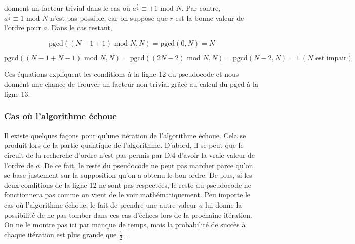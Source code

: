 donnent un facteur trivial dans le cas où $a^{\frac{r}{2}} \equiv \pm 1 \text{ mod } N$. Par contre, $a^{\frac{r}{2}} \equiv 1 \text{ mod } N$ n'est pas possible, car on suppose que $r$ est la bonne valeur de l'ordre pour $a$. Dans le cas restant,

\begin{equation*}
    \text{pgcd}((N - 1 + 1) \text{ mod } N, N) = \text{pgcd}(0, N) = N
\end{equation*}

\begin{equation*}
    \text{pgcd}((N - 1 + N - 1) \text{ mod } N, N) = \text{pgcd}((2N - 2) \text{ mod } N, N) = \text{pgcd}(N-2, N) = 1 \ (\text{$N$ est impair})
\end{equation*}

Ces équations expliquent les conditions à la ligne 12 du pseudocode et nous donnent une chance de trouver un facteur non-trivial grâce au calcul du pgcd à la ligne 13.

\subsubsection*{Cas où l'algorithme échoue}
Il existe quelques façons pour qu'une itération de l'algorithme échoue. Cela se produit lors de la partie quantique de l'algorithme. D'abord, il se peut que le circuit de la recherche d'ordre n'est pas permis par D.4 d'avoir la vraie valeur de l'ordre de $a$. De ce fait, le reste du pseudocode ne peut pas marcher parce qu'on se base justement sur la supposition qu'on a obtenu le bon ordre. De plus, si les deux conditions de la ligne 12 ne sont pas respectées, le reste du pseudocode ne fonctionnera pas comme on vient de le voir mathématiquement. Peu importe le cas où l'algorithme échoue, le fait de prendre une autre valeur $a$ lui donne la possibilité de ne pas tomber dans ces cas d'échecs lors de la prochaine itération. On ne le montre pas ici par manque de temps, mais la probabilité de succès à chaque itération est plus grande que $\frac{1}{2}$ \cite{nielsen00}.